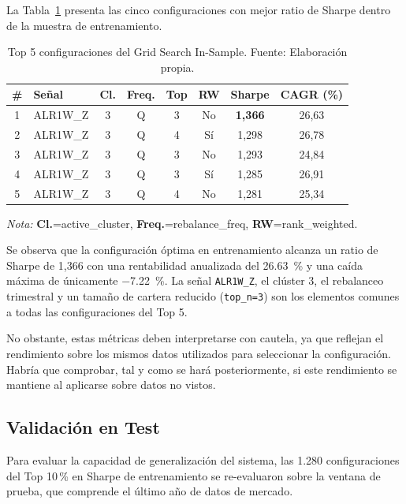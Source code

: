 La Tabla~\ref{tab:top5_is} presenta las cinco configuraciones con
mejor ratio de Sharpe dentro de la muestra de entrenamiento.

\begin{table}[H]
\centering
\small
\begin{tabular}{clcccccc}
\toprule
\textbf{\#} & \textbf{Señal} & \textbf{Cl.} & \textbf{Freq.} & \textbf{Top} &
\textbf{RW} & \textbf{Sharpe} & \textbf{CAGR (\%)} \\
\midrule
1 & ALR1W\_Z  & 3 & Q & 3 & No  & \textbf{1,366} & 26,63 \\
2 & ALR1W\_Z  & 3 & Q & 4 & Sí  & 1,298         & 26,78 \\
3 & ALR1W\_Z  & 3 & Q & 3 & No  & 1,293         & 24,84 \\
4 & ALR1W\_Z  & 3 & Q & 3 & Sí  & 1,285         & 26,91 \\
5 & ALR1W\_Z  & 3 & Q & 4 & No  & 1,281         & 25,34 \\
\bottomrule
\end{tabular}
\caption{Top 5 configuraciones del Grid Search In-Sample.
Fuente: Elaboración propia.}
\label{tab:top5_is}
\begin{flushleft}
\small \textit{Nota:} \textbf{Cl.}=active\_cluster,
\textbf{Freq.}=rebalance\_freq, \textbf{RW}=rank\_weighted.
\end{flushleft}
\end{table}

Se observa que la configuración óptima en entrenamiento alcanza
un ratio de Sharpe de 1,366 con una rentabilidad anualizada del
\SI{26,63}{\percent} y una caída máxima de únicamente \SI{-7.22}{\percent}. La
señal \texttt{ALR1W\_Z}, el clúster 3, el rebalanceo trimestral
y un tamaño de cartera reducido (\texttt{top\_n=3}) son los
elementos comunes a todas las configuraciones del Top 5.

No obstante, estas métricas deben interpretarse con cautela, ya
que reflejan el rendimiento sobre los mismos datos utilizados
para seleccionar la configuración. Habría que comprobar, tal y como se hará posteriormente, si este
rendimiento se mantiene al aplicarse sobre datos no vistos.


\subsection{Validación en Test}

Para evaluar la capacidad de generalización del sistema, las
1.280 configuraciones del Top 10\,\% en Sharpe de entrenamiento
se re-evaluaron sobre la ventana de prueba, que comprende el
último año de datos de mercado. 

